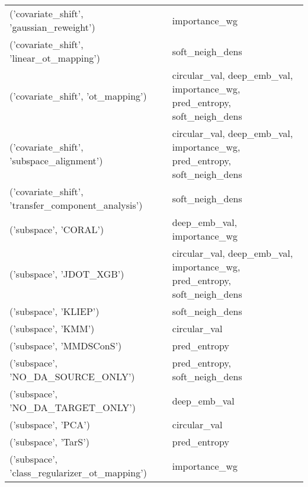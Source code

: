 \begin{tabular}{ll}
 ('covariate\_shift', 'gaussian\_reweight')            & importance\_wg                                                            \\
 ('covariate\_shift', 'linear\_ot\_mapping')            & soft\_neigh\_dens                                                          \\
 ('covariate\_shift', 'ot\_mapping')                   & circular\_val, deep\_emb\_val, importance\_wg, pred\_entropy, soft\_neigh\_dens \\
 ('covariate\_shift', 'subspace\_alignment')           & circular\_val, deep\_emb\_val, importance\_wg, pred\_entropy, soft\_neigh\_dens \\
 ('covariate\_shift', 'transfer\_component\_analysis')  & soft\_neigh\_dens                                                          \\
 ('subspace', 'CORAL')                               & deep\_emb\_val, importance\_wg                                              \\
 ('subspace', 'JDOT\_XGB')                            & circular\_val, deep\_emb\_val, importance\_wg, pred\_entropy, soft\_neigh\_dens \\
 ('subspace', 'KLIEP')                               & soft\_neigh\_dens                                                          \\
 ('subspace', 'KMM')                                 & circular\_val                                                             \\
 ('subspace', 'MMDSConS')                            & pred\_entropy                                                             \\
 ('subspace', 'NO\_DA\_SOURCE\_ONLY')                   & pred\_entropy, soft\_neigh\_dens                                            \\
 ('subspace', 'NO\_DA\_TARGET\_ONLY')                   & deep\_emb\_val                                                             \\
 ('subspace', 'PCA')                                 & circular\_val                                                             \\
 ('subspace', 'TarS')                                & pred\_entropy                                                             \\
 ('subspace', 'class\_regularizer\_ot\_mapping')        & importance\_wg                                                            \\

\end{tabular}
